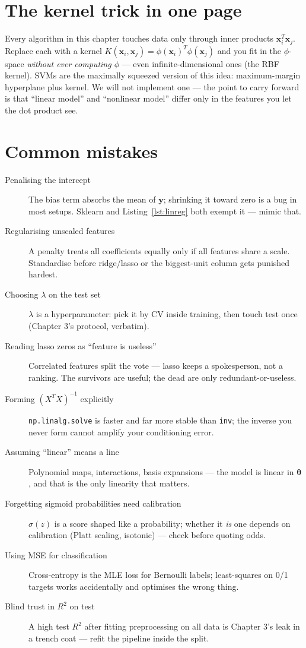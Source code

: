 \section{The kernel trick in one page}\label{sec:kernel}

Every algorithm in this chapter touches data only through inner products
$\mathbf{x}_i^T\mathbf{x}_j$. Replace each with a kernel
$K(\mathbf{x}_i,\mathbf{x}_j) = \phi(\mathbf{x}_i)^T\phi(\mathbf{x}_j)$
and you fit in the $\phi$-space \emph{without ever computing $\phi$} ---
even infinite-dimensional ones (the RBF kernel). SVMs are the maximally
squeezed version of this idea: maximum-margin hyperplane plus kernel.
We will not implement one --- the point to carry forward is that
``linear model'' and ``nonlinear model'' differ only in the features you
let the dot product see.

\section{Common mistakes}

\begin{description}
\item[Penalising the intercept] The bias term absorbs the mean of
  $\mathbf{y}$; shrinking it toward zero is a bug in most setups. Sklearn
  and Listing~\ref{lst:linreg} both exempt it --- mimic that.
\item[Regularising unscaled features] A penalty treats all coefficients
  equally only if all features share a scale. Standardise before
  ridge/lasso or the biggest-unit column gets punished hardest.
\item[Choosing $\lambda$ on the test set] $\lambda$ is a hyperparameter:
  pick it by CV inside training, then touch test once (Chapter 3's
  protocol, verbatim).
\item[Reading lasso zeros as ``feature is useless''] Correlated features
  split the vote --- lasso keeps a spokesperson, not a ranking. The
  survivors are useful; the dead are only redundant-or-useless.
\item[Forming $(X^TX)^{-1}$ explicitly] \texttt{np.linalg.solve} is
  faster and far more stable than \texttt{inv}; the inverse you never
  form cannot amplify your conditioning error.
\item[Assuming ``linear'' means a line] Polynomial maps, interactions,
  basis expansions --- the model is linear in $\boldsymbol\theta$, and
  that is the only linearity that matters.
\item[Forgetting sigmoid probabilities need calibration] $\sigma(z)$ is
  a score shaped like a probability; whether it \emph{is} one depends on
  calibration (Platt scaling, isotonic) --- check before quoting odds.
\item[Using MSE for classification] Cross-entropy is the MLE loss for
  Bernoulli labels; least-squares on 0/1 targets works accidentally and
  optimises the wrong thing.
\item[Blind trust in $R^2$ on test] A high test $R^2$ after fitting
  preprocessing on all data is Chapter 3's leak in a trench coat ---
  refit the pipeline inside the split.
\end{description}

